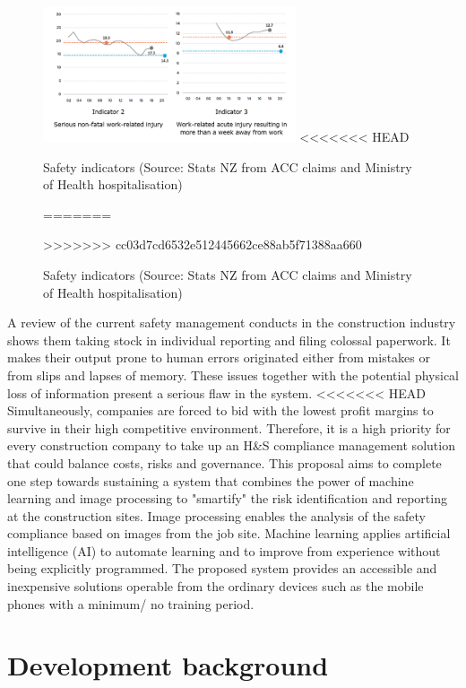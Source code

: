 \documentclass{article}
\begin{document}
\begin{figure}[htbp]
\centering
\includegraphics[height=150]{./Images/fig_01.png}
<<<<<<< HEAD
\caption{\label{fig:orgfc13c3f}Safety indicators (Source: Stats NZ from ACC claims and Ministry of Health hospitalisation)}
=======
\caption{\label{fig:orgf490c35}Safety indicators (Source: Stats NZ from ACC claims and Ministry of Health hospitalisation)}
>>>>>>> cc03d7cd6532e512445662ce88ab5f71388aa660
\end{figure}


A review of the current safety management conducts in the construction industry shows them taking stock in individual reporting and filing colossal paperwork.
It makes their output prone to human errors originated either from mistakes or from slips and lapses of memory.
These issues together with the potential physical loss of information present a serious flaw in the system.
<<<<<<< HEAD
Simultaneously, companies are forced to bid with the lowest profit margins to survive in their high competitive environment. Therefore, it is a high priority for every construction company to take up an H\&S compliance management solution that could balance costs, risks and governance.
This proposal aims to complete one step towards sustaining a system that combines the power of machine learning and image processing to "smartify" the risk identification and reporting at the construction sites. Image processing enables the analysis of the safety compliance based on images from the job site.
Machine learning applies artificial intelligence (AI) to automate learning and to improve from experience without being explicitly programmed.
The proposed system provides an accessible and inexpensive solutions operable from the ordinary devices such as the mobile phones with a minimum/ no training period.

\section{Development background}
\label{sec:org9b03210}
\end{document}
